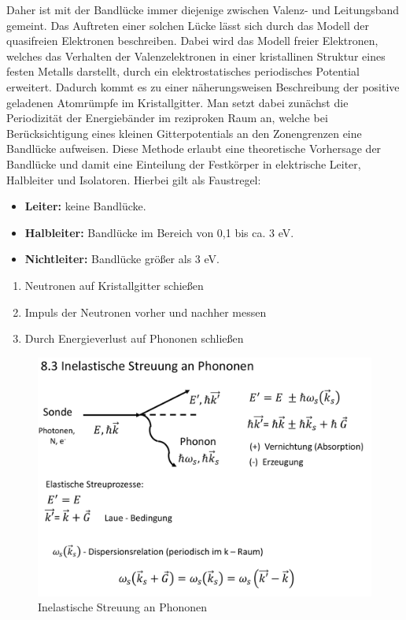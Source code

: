 Daher ist mit der Bandlücke immer diejenige zwischen Valenz- und Leitungsband gemeint.
Das Auftreten einer solchen Lücke lässt sich durch das Modell der quasifreien Elektronen beschreiben. Dabei wird das Modell freier Elektronen, welches das Verhalten der Valenzelektronen in einer kristallinen Struktur eines festen Metalls darstellt, durch ein elektrostatisches periodisches Potential
erweitert. Dadurch kommt es zu einer näherungsweisen Beschreibung der positive geladenen Atomrümpfe im Kristallgitter. Man setzt dabei zunächst die Periodizität der Energiebänder im reziproken Raum an, welche bei Berücksichtigung eines kleinen Gitterpotentials an den Zonengrenzen eine Bandlücke aufweisen. 
Diese Methode erlaubt eine theoretische Vorhersage der Bandlücke und damit eine Einteilung der Festkörper in elektrische Leiter, Halbleiter und Isolatoren.
Hierbei gilt als Faustregel:


\begin{itemize}
    \item \textbf{Leiter:} keine Bandlücke.
    \item \textbf{Halbleiter:} Bandlücke im Bereich von 0,1 bis ca. 3 eV.
    \item \textbf{Nichtleiter:} Bandlücke größer als 3 eV.
\end{itemize}

\label{q:6}

\begin{enumerate}
    \item Neutronen auf Kristallgitter schießen
    \item Impuls der Neutronen vorher und nachher messen
    \item Durch Energieverlust auf Phononen schließen
\end{enumerate}

\begin{figure}[H]  
    \centering
    \includegraphics[width=.8\textwidth]{resources/05-01-2015/Frage6_1.png}
    \caption{Inelastische Streuung an Phononen}
\end{figure}

